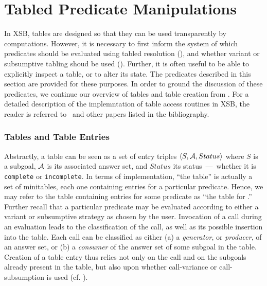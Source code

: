 
\newcommand{\retn}{\code{ret/n}}


\section{Tabled Predicate Manipulations} \label{sec:TablingPredicates}

In XSB, tables are designed so that they can be used transparently by
computations.  However, it is necessary to first inform the system of
which predicates should be evaluated using tabled resolution
(), and whether variant or subsumptive
tabling shoud be used ().  Further, it
is often useful to be able to explicitly inspect a table, or to alter
its state.  The predicates described in this section are provided for
these purposes.  In order to ground the discussion of these
predicates, we continue our overview of tables and table creation from
.  For a detailed description of the
implemntation of table access routines in XSB, the reader is referred
to~\cite{RRSSW98,TST99,CuSW99b} and other papers listed in the
bibliography.


\subsubsection*{Tables and Table Entries}

Abstractly, a table can be seen as a set of entry triples $\langle
S,{\cal A},Status \rangle$ where $S$ is a subgoal, ${\cal A}$ is its associated
answer set, and $Status$ its status~---~whether it is
\texttt{complete} or \texttt{incomplete}.  In terms of implementation,
``the table'' is actually a set of minitables, each one containing
entries for a particular predicate.  Hence, we may refer to the table
containing entries for some predicate  as ``the table for
.''  Further recall that a particular predicate may be
evaluated according to either a variant or subsumptive strategy as
chosen by the user.  Invocation of a call during an evaluation leads
to the classification of the call, as well as its possible insertion
into the table.  Each call can be classified as either (a) a
\emph{generator}, or \emph{producer}, of an answer set, or (b) a
\emph{consumer} of the answer set of some subgoal in the table.
Creation of a table entry thus relies not only on the call and on the
subgoals already present in the table, but also upon whether
call-variance or call-subsumption is used (cf. \cite{TST99}).

